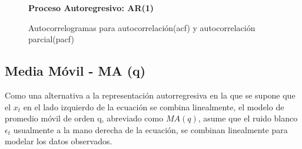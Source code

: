 
\begin{figure}[H]
		\centering
		\textbf{Proceso Autoregresivo: AR(1)}\par\medskip
		\caption{Autocorrelogramas para autocorrelación(acf) y autocorrelación parcial(pacf)}\label{fig8}

\end{figure}


\pagebreak
\subsection{Media M\'ovil - MA (q)}

Como una alternativa a la representaci\'on autorregresiva en la que se supone que el $x_t$ en el lado izquierdo de la ecuaci\'on se combina linealmente, el modelo de promedio m\'ovil de orden q, abreviado como $MA (q)$, asume que el ruido blanco $\epsilon_t$ usualmente a la mano derecha de la ecuaci\'on, se combinan linealmente para modelar los datos observados.

